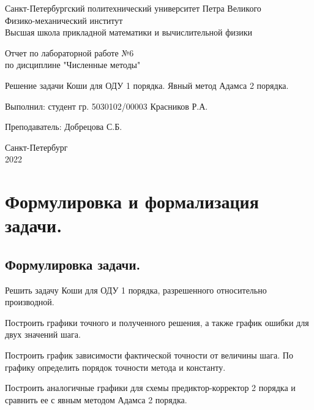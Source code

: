 \documentclass[a4paper, 12pt]{article}
\begin{document}
	\begin{titlepage}
		\begin{center}
			Санкт-Петербургский политехнический университет Петра Великого \\ Физико-механический институт \\ Высшая школа прикладной математики и вычислительной физики
		\end{center}
		\vspace{10em}
		\begin{center}
			\Large Отчет по лабораторной работе №6 \\ по дисциплине "Численные методы"
		\end{center}
		\vspace{1em}
		\begin{center}
			\Huge Решение задачи Коши для ОДУ 1 порядка. Явный метод Адамса 2 порядка.
		\end{center}
		\vspace{15em}
		{\Large 
			
			Выполнил: студент гр. 5030102/00003 Красников Р.А.
			\vspace{1em}
			
			Преподаватель: Добрецова С.Б.}
		\vspace{\fill}
		\begin{center}
			Санкт-Петербург \\ 2022
		\end{center}
	\end{titlepage}
	\newpage
	
	\section{Формулировка и формализация задачи.}
	
	\subsection{Формулировка задачи.}
	
	Решить задачу Коши для ОДУ 1 порядка, разрешенного относительно производной.
	
	Построить графики точного и полученного решения, а также график ошибки для двух значений шага.
	
	Построить график зависимости фактической точности от величины шага. По графику определить порядок точности метода и константу.
	
	Построить аналогичные графики для схемы предиктор-корректор 2 порядка и сравнить ее с явным методом Адамса 2 порядка.
	
\end{document}
